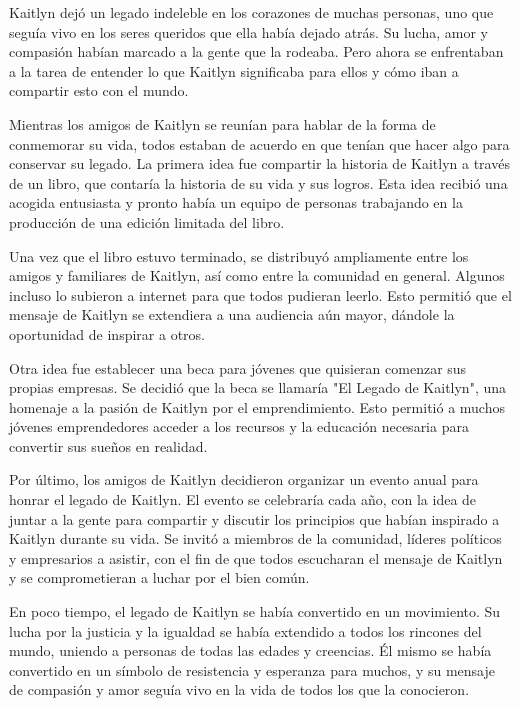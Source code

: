 

Kaitlyn dejó un legado indeleble en los corazones de muchas personas, uno que seguía vivo en los seres queridos que ella había dejado atrás. Su lucha, amor y compasión habían marcado a la gente que la rodeaba. Pero ahora se enfrentaban a la tarea de entender lo que Kaitlyn significaba para ellos y cómo iban a compartir esto con el mundo.

Mientras los amigos de Kaitlyn se reunían para hablar de la forma de conmemorar su vida, todos estaban de acuerdo en que tenían que hacer algo para conservar su legado. La primera idea fue compartir la historia de Kaitlyn a través de un libro, que contaría la historia de su vida y sus logros. Esta idea recibió una acogida entusiasta y pronto había un equipo de personas trabajando en la producción de una edición limitada del libro.

Una vez que el libro estuvo terminado, se distribuyó ampliamente entre los amigos y familiares de Kaitlyn, así como entre la comunidad en general. Algunos incluso lo subieron a internet para que todos pudieran leerlo. Esto permitió que el mensaje de Kaitlyn se extendiera a una audiencia aún mayor, dándole la oportunidad de inspirar a otros.

Otra idea fue establecer una beca para jóvenes que quisieran comenzar sus propias empresas. Se decidió que la beca se llamaría "El Legado de Kaitlyn", una homenaje a la pasión de Kaitlyn por el emprendimiento. Esto permitió a muchos jóvenes emprendedores acceder a los recursos y la educación necesaria para convertir sus sueños en realidad.

Por último, los amigos de Kaitlyn decidieron organizar un evento anual para honrar el legado de Kaitlyn. El evento se celebraría cada año, con la idea de juntar a la gente para compartir y discutir los principios que habían inspirado a Kaitlyn durante su vida. Se invitó a miembros de la comunidad, líderes políticos y empresarios a asistir, con el fin de que todos escucharan el mensaje de Kaitlyn y se comprometieran a luchar por el bien común.

En poco tiempo, el legado de Kaitlyn se había convertido en un movimiento. Su lucha por la justicia y la igualdad se había extendido a todos los rincones del mundo, uniendo a personas de todas las edades y creencias. Él mismo se había convertido en un símbolo de resistencia y esperanza para muchos, y su mensaje de compasión y amor seguía vivo en la vida de todos los que la conocieron.